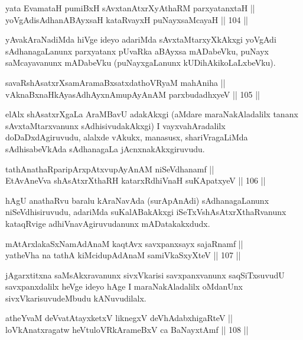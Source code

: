 \begin{shl}
yata EvamataH pumiBxH sAvxtanAtxrXyAthaRM parxyatanxtaH ||  \\
yoVgAdisAdhanABAyxsaH kataRvayxH puNayxsaMcayaH \hfill || 104 ||  
\end{shl}

\begin{artha}
yAvakAraNadiMda hiVge ideyo adariMda sAvxtaMtarxyXkAkxgi yoVgAdi
sAdhanagaLanunx parxyatanx pUvaRka aBAyxsa mADabeVku, puNayx
saMcayavanunx mADabeVku (puNayxgaLanunx kUDihAkikoLaLxbeVku).
\end{artha}

\begin{shl}
savaRshAsatxrXsamAramaBxsatxdathoVR\s yaM mahAniha || \\
vAknaBxnaHkAyasAdhAyxnAmupAyAnAM parxbudadhxyeV \hfill || 105 ||  
\end{shl}

\begin{artha}
elAlx shAsatxrXgaLa AraMBavU adakAkxgi (aMdare maraNakAladalilx tananx
sAvxtaMtarxvanunx sAdhisivudakAkxgi) I vayxvahAradalilx
doDaDxdAgiruvudu, alalxde vAkukx, manasusx, shariVragaLiMda
sAdhisabeVkAda sAdhanagaLa jAcnxnakAkxgiruvudu.
\end{artha}

\begin{shl}
tathA\s nathaRparipArxpAtxvupAyAnAM niSeVdhanamf || \\
EtAvAneVva shAsAtxrXthaRH katarxRdhiVnaH suKApatxyeV \hfill || 106 ||  
\end{shl}

\begin{artha}
hAgU anathaRvu baralu kAraNavAda (surApAnAdi) sAdhanagaLanunx
niSeVdhisiruvudu, adariMda suKalABakAkxgi iSeTxVshAsAtxrXthaRvanunx
kataqRvige adhiVnavAgiruvudanunx mADatakakxdudx.
\end{artha}

\begin{shl}
mAtArxlakaSxNamAdAnaM kaqtAvx savxpanxsayx sajaRnamf ||  \\
yatheVha na tathA kiMcidupAdAnaM samiVkaSxyXteV \hfill || 107 ||  
\end{shl}

\begin{artha}
jAgarxtitxna saMsAkxravanunx sivxVkarisi savxpanxvanunx saqSiTxsuvudU
savxpanxdalilx heVge ideyo hAge I maraNakAladalilx oMdanUnx
sivxVkarisuvudeMbudu kANuvudilalx.
\end{artha}

\begin{shl}
atheYvaM deVvatAtayxketxV liknegxV deVhAdabxhigaRteV || \\
loVkAnatxragatw heVtuloVRkArameBxV ca BaNayxtAmf \hfill || 108 ||  
\end{shl}

